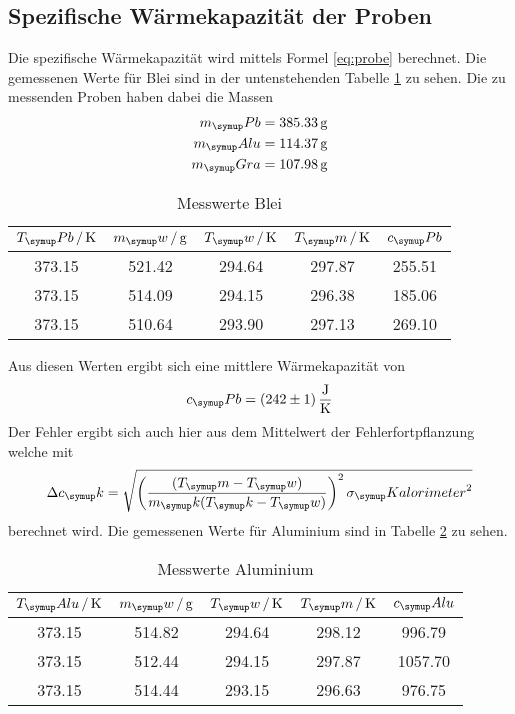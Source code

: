 \subsection{Spezifische Wärmekapazität der Proben}
Die spezifische Wärmekapazität wird mittels Formel \eqref{eq:probe} berechnet.
Die gemessenen Werte für Blei sind in der untenstehenden Tabelle \ref{tab:pb}
zu sehen.
Die zu messenden Proben haben dabei die Massen
\begin{align*}
m_\su{Pb} &= 385.33\gr \\
m_\su{Alu}&= 114.37\gr \\
m_\su{Gra}&= 107.98\gr
\end{align*}
\begin{table}
  \centering
  \begin{tabular}{c c c c c}
    \toprule
    $T_\su{Pb}\,/\Kel$ & $m_\su{w}\,/\gr$ & $T_\su{w}\,/\Kel
    $ & $T_\su{m}\,/\Kel$ & $c_\su{Pb}$\\
    \midrule
    373.15 & 521.42 & 294.64 & 297.87 & 255.51 \\
    373.15 & 514.09 & 294.15 & 296.38 & 185.06 \\
    373.15 & 510.64 & 293.90 & 297.13 & 269.10 \\
    \bottomrule
  \end{tabular}
  \caption{Messwerte Blei}
  \label{tab:pb}
\end{table}
Aus diesen Werten ergibt sich eine mittlere Wärmekapazität von
\begin{equation*}
  c_\su{Pb}=(242\pm1)\,\si{\joule\per\kelvin}
\end{equation*}
Der Fehler ergibt sich auch hier aus dem Mittelwert der Fehlerfortpflanzung
welche mit
\begin{equation}
  \Delta c_\su{k} = \sqrt{\left(\frac{(T_\su{m}-T_\su{w})}{m_\su{k}
  (T_\su{k}-T_\su{w})}\right)^2\sigma_\su{Kalorimeter}^2}
  \label{eq:gauss}
\end{equation}
berechnet wird.
Die gemessenen Werte für Aluminium sind in Tabelle \ref{tab:alu} zu sehen.
\begin{table}
  \centering
  \begin{tabular}{c c c c c}
    \toprule
    $T_\su{Alu}\,/\Kel$ & $m_\su{w}\,/\gr$ & $T_\su{w}\,/\Kel
    $ & $T_\su{m}\,/\Kel$ & $c_\su{Alu}$\\
    \midrule
    373.15 & 514.82 & 294.64 & 298.12 & 996.79\\
    373.15 & 512.44 & 294.15 & 297.87 & 1057.70\\
    373.15 & 514.44 & 293.15 & 296.63 & 976.75\\
    \bottomrule
  \end{tabular}
  \caption{Messwerte Aluminium}
  \label{tab:alu}
\end{table}
